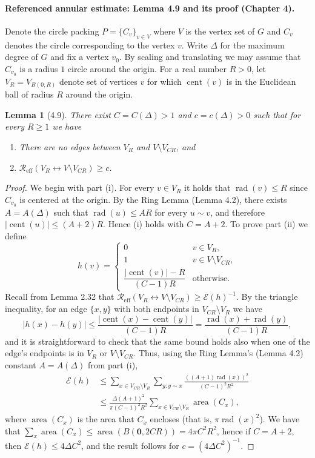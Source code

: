 \documentclass[UTF8,11pt]{ctexart}
\newtheorem*{lemma}{Lemma}
\theoremstyle{definition}
\newcommand{\Reff}{\mathcal R_{\mathrm{eff}}}
\begin{document}
\paragraph{Referenced annular estimate: Lemma 4.9 and its proof (Chapter 4).}
Denote the circle packing $P=\{C_v\}_{v\in V}$ where $V$ is the vertex set of $G$ and $C_v$ denotes the circle corresponding to the vertex $v$. Write $\Delta$ for the maximum degree of $G$ and fix a vertex $v_0$. By scaling and translating we may assume that $C_{v_0}$ is a radius $1$ circle around the origin. For a real number $R>0$, let $V_R=V_{B(0,R)}$ denote set of vertices $v$ for which $\operatorname{cent}(v)$ is in the Euclidean ball of radius $R$ around the origin.
\begin{lemma}[4.9]
There exist $C=C(\Delta)>1$ and $c=c(\Delta)>0$ such that for every $R\ge1$ we have
\begin{enumerate}[label=(\roman*)]
\item There are no edges between $V_R$ and $V\setminus V_{CR}$, and
\item $\Reff(V_R\leftrightarrow V\setminus V_{CR})\ge c$.
\end{enumerate}
\end{lemma}
\begin{proof}
We begin with part (i). For every $v\in V_R$ it holds that $\operatorname{rad}(v)\le R$ since $C_{v_0}$ is centered at the origin. By the Ring Lemma (Lemma 4.2), there exists $A=A(\Delta)$ such that $\operatorname{rad}(u)\le AR$ for every $u\sim v$, and therefore $|\operatorname{cent}(u)|\le(A+2)R$. Hence (i) holds with $C=A+2$.
To prove part (ii) we define
\[
h(v)=\begin{cases}
0&v\in V_R,\\1&v\in V\setminus V_{CR},\\
\dfrac{|\operatorname{cent}(v)|-R}{(C-1)R}&\text{otherwise}.
\end{cases}
\]
Recall from Lemma 2.32 that $\Reff(V_R\leftrightarrow V\setminus V_{CR})\ge\mathcal E(h)^{-1}$. By the triangle inequality, for an edge $\{x,y\}$ with both endpoints in $V_{CR}\setminus V_R$ we have
\[
|h(x)-h(y)|\le\frac{|\operatorname{cent}(x)-\operatorname{cent}(y)|}{(C-1)R}
=\frac{\operatorname{rad}(x)+\operatorname{rad}(y)}{(C-1)R},
\]
and it is straightforward to check that the same bound holds also when one of the edge's endpoints is in $V_R$ or $V\setminus V_{CR}$. Thus, using the Ring Lemma's (Lemma 4.2) constant $A=A(\Delta)$ from part (i),
\begin{align*}
\mathcal E(h)
&\le\sum_{x\in V_{CR}\setminus V_R}\sum_{y:y\sim x}
\frac{((A+1)\operatorname{rad}(x))^2}{(C-1)^2R^2}\\
&\le\frac{\Delta(A+1)^2}{\pi(C-1)^2R^2}\sum_{x\in V_{CR}\setminus V_R}\operatorname{area}(C_x),
\end{align*}
where $\operatorname{area}(C_x)$ is the area that $C_x$ encloses (that is, $\pi\operatorname{rad}(x)^2$). We have that $\sum_x\operatorname{area}(C_x)\le\operatorname{area}(B(\mathbf0,2CR))=4\pi C^2R^2$, hence if $C=A+2$, then $\mathcal E(h)\le4\Delta C^2$, and the result follows for $c=(4\Delta C^2)^{-1}$.
\end{proof}
\end{document}
